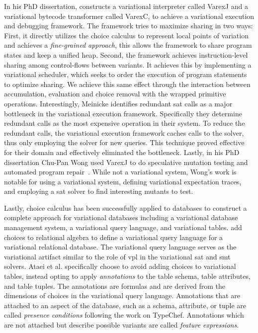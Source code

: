 In his PhD dissertation, \citet{M14,JensDebugging} constructs a variational
interpreter called VarexJ and a variational bytecode transformer called VarexC,
to achieve a variational execution and debugging framework. The framework tries
to maximize sharing in two ways: First, it directly utilizes the choice calculus
to represent local points of variation and achieves a \emph{fine-grained
  approach}, this allows the framework to share program states and keep a
unified heap. Second, the framework achieves instruction-level sharing among
control-flows between variants. It achieves this by implementing a variational
scheduler, which seeks to order the execution of program statements to optimize
sharing. We achieve this same effect through the interaction between
accumulation, evaluation and choice removal with the wrapped primitive
operations. Interestingly, Meinicke identifies redundant \ac{sat} calls as a
major bottleneck in the variational execution framework. Specifically they
determine redundant  calls as the most expensive operation in
their system. To reduce the redundant calls, the variational execution framework
caches calls to the solver, thus only employing the solver for new queries. This
technique proved effective for their domain and effectively eliminated the
bottleneck. Lastly, in his PhD dissertation Chu-Pan Wong used VarexJ to do
speculative mutation testing and automated program repair~\cite{ChuPanThesis}.
While not a variational system, Wong's work is notable for using a variational
system, defining variational expectation traces, and employing a \ac{sat} solver
to find interesting mutants to test.


Lastly, choice calculus has been successfully applied to databases to construct
a complete approach for variational databases including a variational database
management system, a variational query language, and variational tables.
\citet{ATW17dbpl,ATW18poly} add choices to relational algebra to define a
variational query language for a variational relational database. The
variational query language serves as the variational artifact similar to the
role of \ac{vpl} in the variational \ac{sat} and \ac{smt} solvers. Ataei et al.
specifically choose to avoid adding choices to variational tables, instead
opting to apply \emph{annotations} to the table schema, table attributes, and
table tuples. The annotations are \pl{} formulas and are derived from the
dimensions of choices in the variational query language. Annotations that are
attached to an aspect of the database, such as a schema, attribute, or tuple are
called \emph{presence conditions} following the work on TypeChef. Annotations
which are not attached but describe possible variants are called \emph{feature
  expressions}.

